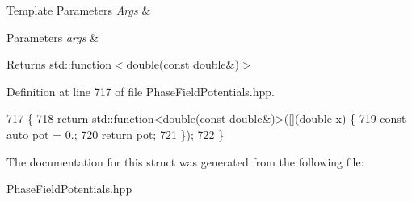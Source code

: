 \begin{DoxyTemplParams}{Template Parameters}
{\em Args} & \\
\hline
\end{DoxyTemplParams}

\begin{DoxyParams}{Parameters}
{\em args} & \\
\hline
\end{DoxyParams}
\begin{DoxyReturn}{Returns}
std\+::function$<$double(const double\&)$>$ 
\end{DoxyReturn}


Definition at line 717 of file Phase\+Field\+Potentials.\+hpp.


\begin{DoxyCode}
717                                                         \{
718     \textcolor{keywordflow}{return} std::function<double(const double&)>([](\textcolor{keywordtype}{double} x) \{
719       \textcolor{keyword}{const} \textcolor{keyword}{auto} pot = 0.;
720       \textcolor{keywordflow}{return} pot;
721     \});
722   \}
\end{DoxyCode}


The documentation for this struct was generated from the following file\+:\begin{DoxyCompactItemize}
\item 
Phase\+Field\+Potentials.\+hpp\end{DoxyCompactItemize}
